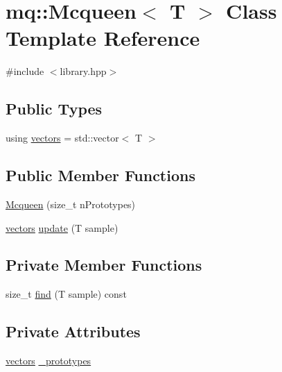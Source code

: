 \hypertarget{classmq_1_1Mcqueen}{}\section{mq\+:\+:Mcqueen$<$ T $>$ Class Template Reference}
\label{classmq_1_1Mcqueen}


{\ttfamily \#include $<$library.\+hpp$>$}

\subsection*{Public Types}
\begin{DoxyCompactItemize}
\item 
using \mbox{\hyperlink{classmq_1_1Mcqueen_a4615619809177f994658d0841443a725}{vectors}} = std\+::vector$<$ T $>$
\end{DoxyCompactItemize}
\subsection*{Public Member Functions}
\begin{DoxyCompactItemize}
\item 
\mbox{\hyperlink{classmq_1_1Mcqueen_ac732b06103447d1bac272fdb277b2d4d}{Mcqueen}} (size\+\_\+t n\+Prototypes)
\item 
\mbox{\hyperlink{classmq_1_1Mcqueen_a4615619809177f994658d0841443a725}{vectors}} \mbox{\hyperlink{classmq_1_1Mcqueen_abb4b840cc6d7a540fe23da4b9f518281}{update}} (T sample)
\end{DoxyCompactItemize}
\subsection*{Private Member Functions}
\begin{DoxyCompactItemize}
\item 
size\+\_\+t \mbox{\hyperlink{classmq_1_1Mcqueen_ac9819e90d007adc2e32fa72c0c332a64}{find}} (T sample) const
\end{DoxyCompactItemize}
\subsection*{Private Attributes}
\begin{DoxyCompactItemize}
\item 
\mbox{\hyperlink{classmq_1_1Mcqueen_a4615619809177f994658d0841443a725}{vectors}} \mbox{\hyperlink{classmq_1_1Mcqueen_a1fec25641cc2efe5a6f1af1118651d73}{\+\_\+prototypes}}
\end{DoxyCompactItemize}


